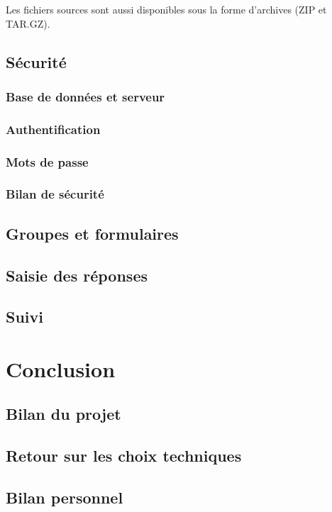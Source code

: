 \documentclass[11pt,french]{memoir}
\begin{document}
	Les fichiers sources sont aussi disponibles sous la forme d'archives (ZIP et TAR.GZ).


	\section{Sécurité}\label{sec:securite}

	\subsection{Base de données et serveur}\label{subsec:base-de-donnees-et-serveur}

	\subsection{Authentification}\label{subsec:authentification}

	\subsection{Mots de passe}\label{subsec:mots-de-passe}

	\subsection{Bilan de sécurité}\label{subsec:bilan-de-securité}


	\section{Groupes et formulaires}\label{sec:groupes-et-formulaires}


	\section{Saisie des réponses}\label{sec:saisie-des-reponses}


	\section{Suivi}\label{sec:suivi}


	\chapter{Conclusion}\label{ch:conclusion}


	\section{Bilan du projet}\label{sec:bilan-du-projet}


	\section{Retour sur les choix techniques}\label{sec:retour-sur-les-choix-techniques}


	\section{Bilan personnel}\label{sec:bilan-personnel}

	\appendix
\end{document}
